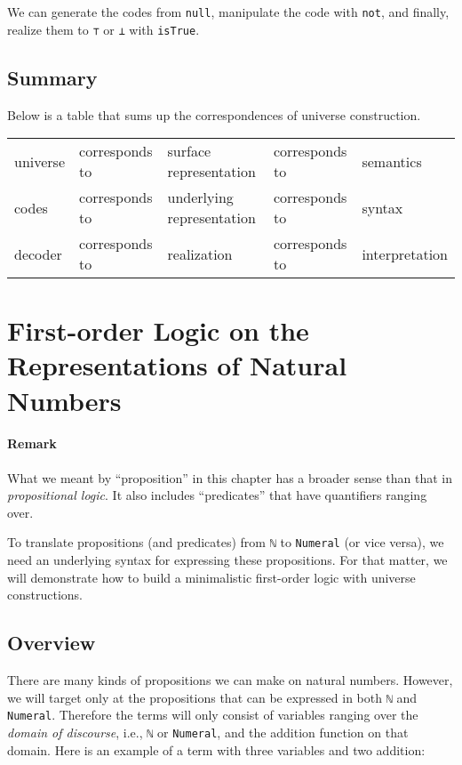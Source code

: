 \documentclass[\main/thesis.tex]{subfiles}
\begin{document}
We can generate the codes from \lstinline|null|,
manipulate the code with \lstinline|not|,
and finally, realize them to \lstinline|⊤| or \lstinline|⊥| with \lstinline|isTrue|.

\subsection{Summary}

Below is a table that sums up the correspondences of universe construction.

\begin{center}
    \begin{adjustbox}{max width=\textwidth}
    \begin{tabular}{ l l l l l }
    universe & corresponds to & surface representation & corresponds to & semantics \\
    codes & corresponds to & underlying representation & corresponds to & syntax \\
    decoder & corresponds to & realization & corresponds to & interpretation \\
    \end{tabular}
    \end{adjustbox}
\end{center}

\section{First-order Logic on the Representations of Natural Numbers}

\paragraph{Remark}
What we meant by ``proposition'' in this chapter has a broader sense than that in
\textit{propositional logic}. It also includes ``predicates'' that have
quantifiers ranging over.

To translate propositions (and predicates) from \lstinline|ℕ| to
\lstinline|Numeral| (or vice versa),
we need an underlying syntax for expressing these propositions.
For that matter, we will demonstrate how to build a minimalistic first-order logic
with universe constructions.

\subsection{Overview}

There are many kinds of propositions we can make on natural numbers.
However, we will target only at the propositions that can be expressed in both
\lstinline|ℕ| and \lstinline|Numeral|.
Therefore the terms will only consist of variables ranging over
the \textit{domain of discourse}, i.e., \lstinline|ℕ| or \lstinline|Numeral|,
and the addition function on that domain. Here is an example of a term
with three variables and two addition:
\end{document}
